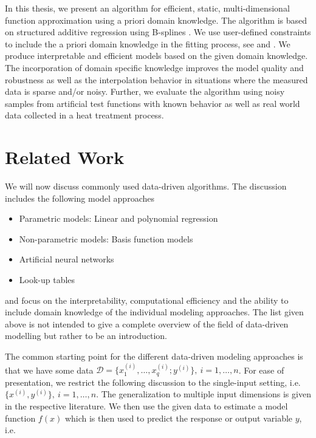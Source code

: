 In this thesis, we present an algorithm for efficient, static, multi-dimensional function approximation using a priori domain knowledge. The algorithm is based on structured additive regression using B-splines \cite{fahrmeir2007regression}. We use user-defined constraints to include the a priori domain knowledge in the fitting process, see \cite{hofner2011monotonicity} and \cite{bollaerts2006simple}. We produce interpretable and efficient models based on the given domain knowledge. The incorporation of domain specific knowledge improves the model quality and robustness as well as the interpolation behavior in situations where the measured data is sparse and/or noisy. Further, we evaluate the algorithm using noisy samples from artificial test functions with known behavior as well as real world data collected in a heat treatment process. 
\section{Related Work}

We will now discuss commonly used data-driven algorithms. The discussion includes the following model approaches

\begin{itemize}
	\item Parametric models: Linear and polynomial regression
	\item Non-parametric models: Basis function models
	\item Artificial neural networks
	\item Look-up tables
\end{itemize}

and focus on the interpretability, computational efficiency and the ability to include domain knowledge of the individual modeling approaches. The list given above is not intended to give a complete overview of the field of data-driven modelling but rather to be an introduction.

The common starting point for the different data-driven modeling approaches is that we have some data $\mathcal{D} = \{x_1^{(i)}, \dots, x_q^{(i)}; y^{(i)} \}, \ i = 1, \dots, n$. For ease of presentation, we restrict the following discussion to the single-input setting, i.e. $\{x^{(i)}, y^{(i)}\}, \ i=1, \dots, n$. The generalization to multiple input dimensions is given in the respective literature. We then use the given data to estimate a model function $f(x)$  which is then used to predict the response or output variable $y$, i.e.

